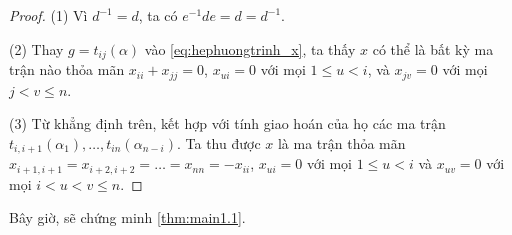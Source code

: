 \begin{proof}
(1) Vì $d^{-1} = d$, ta có $e^{-1} d e = d = d^{-1}$.

(2) Thay $g = t_{ij}(\alpha)$ vào \cref{eq:hephuongtrinh_x}, ta thấy $x$ có thể là bất kỳ ma trận nào thỏa mãn $x_{ii} + x_{jj} = 0$, $x_{ui} = 0$ với mọi $1 \leq u < i$, và $x_{jv} = 0$ với mọi $j < v \leq n$.

(3) Từ khẳng định trên, kết hợp với tính giao hoán của họ các ma trận $t_{i,i+1}(\alpha_1), \dots, t_{in}(\alpha_{n-i})$. Ta thu được $x$ là ma trận thỏa mãn $x_{i+1,i+1} = x_{i+2,i+2} = \dots = x_{nn} = -x_{ii}$, $x_{ui} = 0$ với mọi $1 \leq u < i$ và $x_{uv} = 0$ với mọi $i < u < v \leq n$. 
\end{proof}

Bây giờ, sẽ chứng minh \cref{thm:main1.1}.

